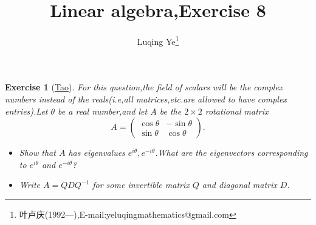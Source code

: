 ﻿\documentclass[a4paper]{article}
\newtheorem*{exe}{Exercise}
\newenvironment{exercise}
{\bigskip\begin{mdframed}\begin{exe}}
    {\end{exe}\end{mdframed}\bigskip}
\begin{document}
\title{\huge{\bf{Linear algebra,Exercise 8}}} \author{\small{Luqing Ye\footnote{叶卢庆(1992---),E-mail:yeluqingmathematics@gmail.com}}}
\maketitle
\begin{exercise}[\href{http://www.math.ucla.edu/~tao/resource/general/115a.3.02f/assign7.pdf}{Tao}]
For this question,the field of scalars will be the complex numbers
instead of the reals(i.e,all matrices,etc.are allowed to have complex
entries).Let $\theta$ be a real number,and let $A$ be the $2\times 2$
rotational matrix
$$
A=\begin{pmatrix}
  \cos\theta&-\sin\theta\\
\sin\theta&\cos\theta
\end{pmatrix}.
$$
\begin{itemize}
\item Show that $A$ has eigenvalues $e^{i\theta},e^{-i\theta}$.What are the
eigenvectors corresponding to $e^{i\theta}$ and $e^{-i\theta}$?
\item Write $A=QDQ^{-1}$ for some invertible matrix $Q$ and diagonal
  matrix $D$. 
\end{itemize}
\end{exercise}
\end{document}
